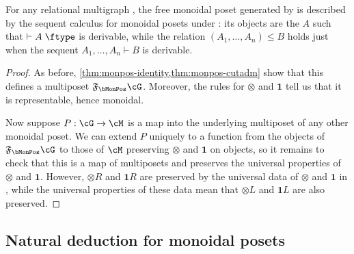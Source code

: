 \documentclass{book}
\let\types\vdash
\def\type{\;\ftype}
\newcommand{\F}[1]{\mathfrak{F}_{#1}}
\def\one{\mathbf{1}}
\let\tensor\otimes
\def\tensorL{\mathord{\tensor}L}
\def\tensorR{\mathord{\tensor}R}
\begin{document}
\begin{thm}\label{thm:monpos-initial}
  For any relational multigraph \cG, the free monoidal poset generated by \cG is described by the sequent calculus for monoidal posets under \cG: its objects are the $A$ such that $\types A\type$ is derivable, while the relation $(A_1,\dots,A_n)\le B$ holds just when the sequent $A_1,\dots,A_n\types B$ is derivable.
\end{thm}
\begin{proof}
  As before, \cref{thm:monpos-identity,thm:monpos-cutadm} show that this defines a multiposet $\F\bMonPos\cG$.
  Moreover, the rules for $\tensor$ and $\one$ tell us that it is representable, hence monoidal.

  Now suppose $P:\cG\to\cM$ is a map into the underlying multiposet of any other monoidal poset.
  We can extend $P$ uniquely to a function from the objects of $\F\bMonPos\cG$ to those of $\cM$ preserving $\tensor$ and $\one$ on objects, so it remains to check that this is a map of multiposets and preserves the universal properties of $\tensor$ and $\one$.
  However, $\tensorR$ and $\one R$ are preserved by the universal data of $\tensor$ and $\one$ in \cM, while the universal properties of these data mean that $\tensorL$ and $\one L$ are also preserved.
\end{proof}

\subsection{Natural deduction for monoidal posets}
\label{sec:natded-monpos}
\end{document}
